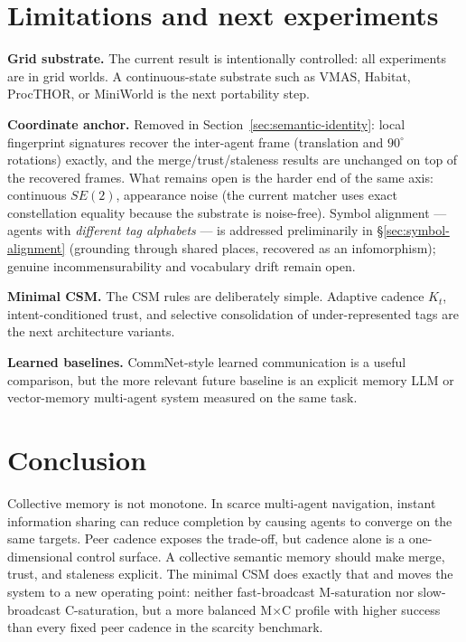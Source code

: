 \documentclass{article}
\begin{document}
\section{Limitations and next experiments}
\label{sec:limitations}

\textbf{Grid substrate.} The current result is intentionally controlled:
all experiments are in grid worlds. A continuous-state substrate such
as VMAS, Habitat, ProcTHOR, or MiniWorld is the next portability step.

\textbf{Coordinate anchor.} Removed in
Section~\ref{sec:semantic-identity}: local fingerprint signatures
recover the inter-agent frame (translation and $90^\circ$ rotations)
exactly, and the merge/trust/staleness results are unchanged on top of
the recovered frames. What remains open is the harder end of the same
axis: continuous $SE(2)$, appearance noise (the current matcher uses
exact constellation equality because the substrate is noise-free). Symbol
alignment --- agents with \emph{different tag alphabets} --- is addressed
preliminarily in \S\ref{sec:symbol-alignment} (grounding through shared places,
recovered as an infomorphism); genuine incommensurability and vocabulary drift
remain open.

\textbf{Minimal CSM.} The CSM rules are deliberately simple. Adaptive
cadence $K_t$, intent-conditioned trust, and selective consolidation of
under-represented tags are the next architecture variants.

\textbf{Learned baselines.} CommNet-style learned communication is a
useful comparison, but the more relevant future baseline is an explicit
memory LLM or vector-memory multi-agent system measured on the same
task.

\section{Conclusion}

Collective memory is not monotone. In scarce multi-agent navigation,
instant information sharing can reduce completion by causing agents to
converge on the same targets. Peer cadence exposes the trade-off, but
cadence alone is a one-dimensional control surface. A collective
semantic memory should make merge, trust, and staleness explicit. The
minimal CSM does exactly that and moves the system to a new operating
point: neither fast-broadcast M-saturation nor slow-broadcast
C-saturation, but a more balanced M$\times$C profile with higher
success than every fixed peer cadence in the scarcity benchmark.
\end{document}
